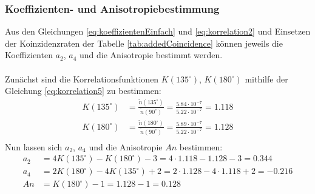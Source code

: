 \documentclass[a4paper,titlepage]{scrartcl}
\numberwithin{equation}{section}
\begin{document}
\subsubsection{Koeffizienten- und Anisotropiebestimmung}
Aus den Gleichungen \ref{eq:koeffizientenEinfach} und \ref{eq:korrelation2} und Einsetzen der Koinzidenzraten der Tabelle \ref{tab:addedCoincidence} können jeweils die Koeffizienten $a_2$, $a_4$ und die Anisotropie bestimmt werden.\\ \\
Zunächst sind die Korrelationsfunktionen $K(135^{\circ})$, $K(180^{\circ})$ mithilfe der Gleichung \ref{eq:korrelation5} zu bestimmen:
\begin{equation*}
\begin{aligned}
K(135^{\circ})&=\frac{\tilde{n}(135^{\circ})}{\tilde{n}(90^{\circ})}=\frac{5.84 \cdot 10^{-7}}{5.22 \cdot 10^{-7}}=1.118\\
K(180^{\circ})&=\frac{\tilde{n}(180^{\circ})}{\tilde{n}(90^{\circ})}=\frac{5.89 \cdot 10^{-7}}{5.22 \cdot 10^{-7}}=1.128\\
\end{aligned}
\end{equation*}
Nun lassen sich $a_2$, $a_4$ und die Anisotropie $An$ bestimmen:
\begin{equation*}
\begin{aligned}
a_2&=4K(135^{\circ})-K(180^{\circ})-3=4 \cdot 1.118-1.128-3=0.344\\
a_4&=2K(180^{\circ}) - 4K(135^{\circ}) + 2=2 \cdot 1.128 - 4 \cdot 1.118 + 2=-0.216\\
An&=K(180^{\circ}) - 1=1.128-1=0.128
\end{aligned}
\end{equation*}
\end{document}
